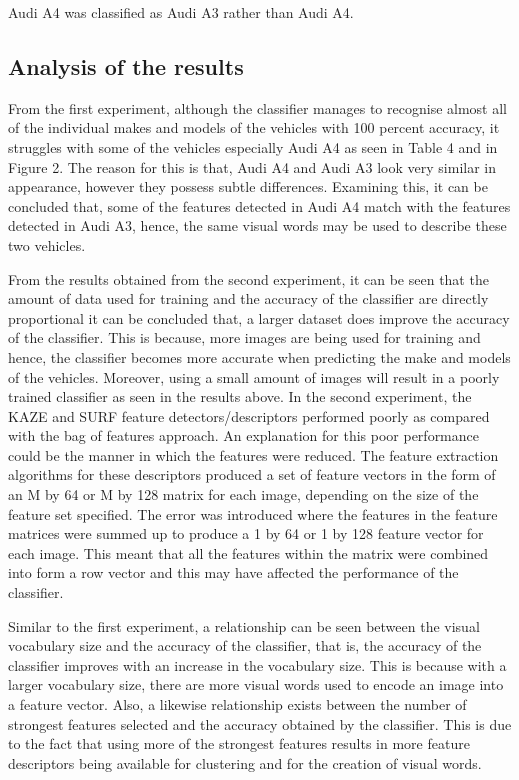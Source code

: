 \documentclass[a4paper, 12pt]{article}
\begin{document}
Audi A4 was classified as Audi A3 rather than Audi A4.

\subsection{ Analysis of the results} 

From the first experiment, although the classifier manages to recognise almost all of the individual makes and models of the vehicles with 100 percent accuracy, it struggles with some of the vehicles especially Audi A4 as seen in Table 4 and in Figure 2. The reason for this is that, Audi A4 and Audi A3 look very similar in appearance, however they possess subtle differences. Examining this, it can be concluded that, some of the features detected in Audi A4 match with the features detected in Audi A3, hence, the same visual words may be used to describe these two vehicles. 

From the results obtained from the second experiment, it can be seen that the amount of data used for training and the accuracy of the classifier are directly proportional it can be concluded that, a larger dataset does improve the accuracy of the classifier. This is because, more images are being used for training and hence, the classifier becomes more accurate when predicting the make and models of the vehicles. Moreover, using a small amount of images will result in a poorly trained classifier as seen in the results above. In the second experiment, the KAZE and SURF feature detectors/descriptors performed poorly as compared with the bag of features approach. An explanation for this poor performance could be the manner in which the features were reduced. The feature extraction algorithms for these descriptors produced a set of feature vectors in the form of an M by 64 or M by 128 matrix for each image, depending on the size of the feature set specified. The error was introduced where the features in the feature matrices were summed up to produce a 1 by 64 or 1 by 128 feature vector for each image. This meant that all the features within the matrix were combined into form a row vector and this may have affected the performance of the classifier.

Similar to the first experiment, a relationship can be seen between the visual vocabulary size and the accuracy of the classifier, that is, the accuracy of the classifier improves with an increase in the vocabulary size. This is because with a larger vocabulary size, there are more visual words used to encode an image into a feature vector. Also, a likewise relationship exists between the number of strongest features selected and the accuracy obtained by the classifier. This is due to the fact that using more of the strongest features results in more feature descriptors being available for clustering and for the creation of visual words. 
\end{document}
